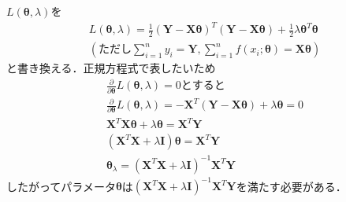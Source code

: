\documentclass[uplatex,b5j]{jsarticle} %
\begin{document}
\section{}
$L(\boldsymbol{\theta}, \lambda)$を
\begin{eqnarray}
    L(\boldsymbol{\theta}, \lambda)
    =\frac{1}{2}(\boldsymbol{Y}-\boldsymbol{X\theta})^T(\boldsymbol{Y}-\boldsymbol{X\theta})+\frac{1}{2}\lambda\boldsymbol{\theta}^T\boldsymbol{\theta} \\ \nonumber
    (ただし \sum_{i=1}^{n}y_i=\boldsymbol{Y}, \sum_{i=1}^{n}f(x_i;\boldsymbol{\theta})=\boldsymbol{X\theta})
\end{eqnarray}
と書き換える．正規方程式で表したいため
\begin{eqnarray}
    \frac{\partial}{\partial \boldsymbol{\theta}}L(\boldsymbol{\theta}, \lambda) = 0 とすると \\ \nonumber
    \frac{\partial}{\partial \boldsymbol{\theta}}L(\boldsymbol{\theta}, \lambda)
    = -\boldsymbol{X}^T(\boldsymbol{Y}-\boldsymbol{X\theta})+\lambda\boldsymbol{\theta} = 0 \\ \nonumber
    \boldsymbol{X}^T\boldsymbol{X}\boldsymbol{\theta}+\lambda\boldsymbol{\theta} = \boldsymbol{X}^T\boldsymbol{Y} \\ \nonumber
    (\boldsymbol{X}^T\boldsymbol{X}+\lambda\boldsymbol{I})\boldsymbol{\theta} = \boldsymbol{X}^T\boldsymbol{Y} \\ \nonumber
    \boldsymbol{\theta}_\lambda = (\boldsymbol{X}^T\boldsymbol{X}+\lambda\boldsymbol{I})^{-1}\boldsymbol{X}^T\boldsymbol{Y}
\end{eqnarray}
したがってパラメータ$\boldsymbol{\theta}$は$(\boldsymbol{X}^T\boldsymbol{X}+\lambda\boldsymbol{I})^{-1}\boldsymbol{X}^T\boldsymbol{Y}$を満たす必要がある．
\end{document}

